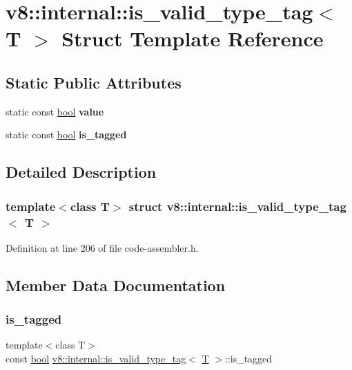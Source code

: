\hypertarget{structv8_1_1internal_1_1is__valid__type__tag}{}\section{v8\+:\+:internal\+:\+:is\+\_\+valid\+\_\+type\+\_\+tag$<$ T $>$ Struct Template Reference}
\label{structv8_1_1internal_1_1is__valid__type__tag}
\subsection*{Static Public Attributes}
\begin{DoxyCompactItemize}
\item 
static const \mbox{\hyperlink{classbool}{bool}} {\bfseries value}
\item 
static const \mbox{\hyperlink{classbool}{bool}} {\bfseries is\+\_\+tagged}
\end{DoxyCompactItemize}


\subsection{Detailed Description}
\subsubsection*{template$<$class T$>$\newline
struct v8\+::internal\+::is\+\_\+valid\+\_\+type\+\_\+tag$<$ T $>$}



Definition at line 206 of file code-\/assembler.\+h.



\subsection{Member Data Documentation}
\mbox{\label{structv8_1_1internal_1_1is__valid__type__tag_a4636b80d4366c6e1595c947d9d6b3466}} 
\subsubsection{\texorpdfstring{is\+\_\+tagged}{is\_tagged}}
{\footnotesize\ttfamily template$<$class T$>$ \\
const \mbox{\hyperlink{classbool}{bool}} \mbox{\hyperlink{structv8_1_1internal_1_1is__valid__type__tag}{v8\+::internal\+::is\+\_\+valid\+\_\+type\+\_\+tag}}$<$ \mbox{\hyperlink{classv8_1_1internal_1_1torque_1_1T}{T}} $>$\+::is\+\_\+tagged\hspace{0.3cm}{\ttfamily [static]}}

